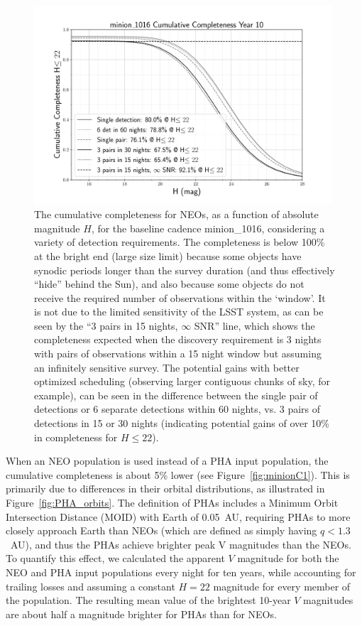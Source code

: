\begin{figure}[t!]
\centering
\includegraphics[width=0.99\textwidth]{figures/minion_1016_neo_More_Cumulative_Completeness}
\vskip -0.2in
\caption{The cumulative completeness for NEOs, as a function of absolute magnitude $H$, for the baseline
cadence minion\_1016, considering a variety of detection requirements. The completeness is below 100\% at the bright end (large size limit) because some objects have
synodic periods longer than the survey duration (and thus effectively ``hide'' behind the Sun), and also because some objects do not receive the required number of observations within the `window'. It is not due to the limited sensitivity of the LSST system, as can be seen by the ``3 pairs in 15 nights, $\infty$ SNR'' line, which shows the completeness expected when the discovery requirement is 3 nights with pairs of observations within a 15 night window but assuming an infinitely sensitive survey. The potential gains with better optimized scheduling (observing larger contiguous chunks of sky, for example), can be seen in the difference between the single pair of detections or 6 separate detections within 60 nights, vs. 3 pairs of detections in 15 or 30 nights (indicating potential gains of over 10\% in completeness for $H\le22$). \label{fig:more_completeness}}
\end{figure}


When an NEO population is used instead of a PHA input population, the cumulative completeness is about 5\% lower
(see Figure~\ref{fig:minionC1}). This is primarily due to differences in their orbital distributions, as illustrated in Figure~\ref{fig:PHA_orbits}. The definition of PHAs includes a Minimum Orbit Intersection Distance (MOID) with Earth of 0.05~AU, requiring PHAs to more closely approach Earth than NEOs (which are defined as simply having $q<1.3$~AU), and thus the PHAs achieve brighter peak V magnitudes than the NEOs. To quantify this effect, we calculated the apparent $V$ magnitude for both the NEO and PHA input populations every night for ten years, while accounting for trailing losses and assuming a constant $H=22$ magnitude for every member of the population. The resulting mean value of the
brightest 10-year $V$ magnitudes are about half a magnitude brighter for PHAs than for NEOs.

